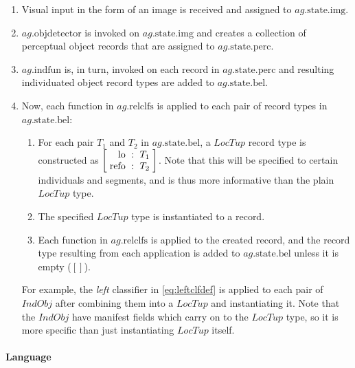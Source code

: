 \begin{enumerate}
\item Visual input in the form of an image is received and assigned to $ag.\text{state}.\text{img}$.
\item $ag.\text{objdetector}$ is invoked on $ag.\text{state.img}$ and creates a collection of perceptual object records that are assigned to $ag.\text{state}.\text{perc}$.
\item $ag.\text{indfun}$ is, in turn, invoked on each record in $ag.\text{state.perc}$ and resulting individuated object record types are added to $ag.\text{state.bel}$.
\item Now, each function in $ag.\text{relclfs}$ is applied to each pair of record types in $ag.\text{state.bel}$:
	\begin{enumerate}
    \item For each pair $T_1$ and $T_2$ in $ag.\text{state.bel}$, a $LocTup$ record type is constructed as $\rec{\text{lo} &:& T_1 \\ \text{refo} &:& T_2}$. Note that this will be specified to certain individuals and segments, and is thus more informative than the plain $LocTup$ type.
    \item The specified $LocTup$ type is instantiated to a record.
	\item Each function in $ag.\text{relclfs}$ is applied to the created record, and the record type resulting from each application is added to $ag.\text{state.bel}$ unless it is empty ($[]$).
	\end{enumerate}
	For example, the \textit{left} classifier in \autoref{eq:leftclfdef} is applied to each pair of $IndObj$ after combining them into a $LocTup$ and instantiating it.
    Note that the $IndObj$ have manifest fields which carry on to the $LocTup$ type, so it is more specific than just instantiating $LocTup$ itself.
\end{enumerate}

\paragraph{Language}

